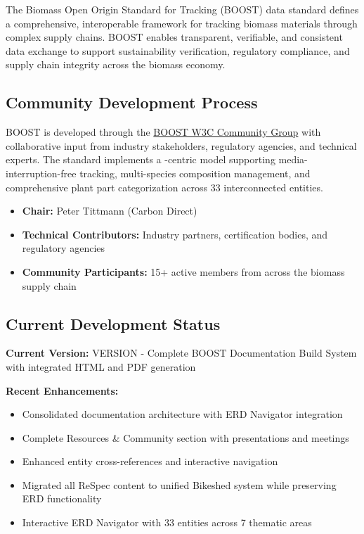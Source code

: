 
The Biomass Open Origin Standard for Tracking (BOOST) data standard defines a comprehensive, interoperable framework for tracking biomass materials through complex supply chains. BOOST enables transparent, verifiable, and consistent data exchange to support sustainability verification, regulatory compliance, and supply chain integrity across the biomass economy.

\subsection{Community Development Process}
\label{sec:community-development-process}

BOOST is developed through the \href{https://www.w3.org/community/boost-01/}{BOOST W3C Community Group} with collaborative input from industry stakeholders, regulatory agencies, and technical experts. The standard implements a \TRU-centric model supporting media-interruption-free tracking, multi-species composition management, and comprehensive plant part categorization across 33 interconnected entities.

\begin{informative}[title=Working Group Leadership]
\begin{itemize}
    \item \textbf{Chair:} Peter Tittmann (Carbon Direct)
    \item \textbf{Technical Contributors:} Industry partners, certification bodies, and regulatory agencies  
    \item \textbf{Community Participants:} 15+ active members from across the biomass supply chain
\end{itemize}
\end{informative}

\subsection{Current Development Status}
\label{sec:development-status}

\begin{important}[title=Current Version Information]
\textbf{Current Version:} {{VERSION}} - Complete BOOST Documentation Build System with integrated HTML and PDF generation

\textbf{Recent Enhancements:}
\begin{itemize}
    \item Consolidated documentation architecture with ERD Navigator integration
    \item Complete Resources \& Community section with presentations and meetings
    \item Enhanced entity cross-references and interactive navigation  
    \item Migrated all ReSpec content to unified Bikeshed system while preserving ERD functionality
    \item Interactive ERD Navigator with 33 entities across 7 thematic areas
\end{itemize}
\end{important}

